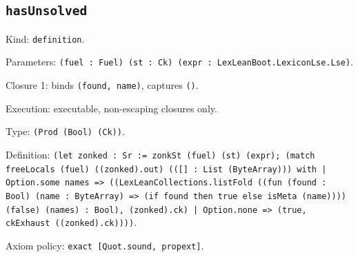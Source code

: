 \documentclass[11pt]{article}
\begin{document}
\subsection*{\texttt{hasUnsolved}}
\noindent Kind: \texttt{definition}.\par
\noindent Parameters: \texttt{(fuel : Fuel) (st : Ck) (expr : LexLeanBoot.LexiconLse.Lse)}.\par
\noindent Closure 1: binds \texttt{(found, name)}, captures \texttt{()}.\par
\noindent Execution: executable, non-escaping closures only.\par
\noindent Type: \texttt{(Prod (Bool) (Ck))}.\par
\noindent Definition: \texttt{(let zonked : Sr := zonkSt (fuel) (st) (expr); (match freeLocals (fuel) ((zonked).out) (([] : List (ByteArray))) with | Option.some names => ((LexLeanCollections.listFold ((fun (found : Bool) (name : ByteArray) => (if found then true else isMeta (name)))) (false) (names) : Bool), (zonked).ck) | Option.none => (true, ckExhaust ((zonked).ck))))}.\par
\noindent Axiom policy: \texttt{exact [Quot.sound, propext]}.\par
\end{document}
